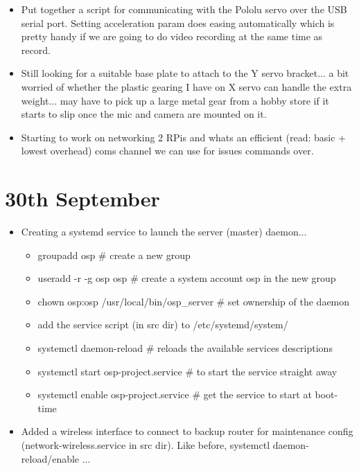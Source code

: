 \begin{itemize}
  \item Put together a script for communicating with the Pololu servo over the USB serial port. Setting acceleration param does easing automatically which is pretty handy if we are going to do video recording at the same time as record.
  \item Still looking for a suitable base plate to attach to the Y servo bracket... a bit worried of whether the plastic gearing I have on X servo can handle the extra weight... may have to pick up a large metal gear from a hobby store if it starts to slip once the mic and camera are mounted on it.
  \item Starting to work on networking 2 RPis and whats an efficient (read: basic + lowest overhead) coms channel we can use for issues commands over.
\end{itemize}



\section*{30th September}

\begin{itemize}
  \item Creating a systemd service to launch the server (master) daemon...
    \begin{itemize}
      \item groupadd osp \# create a new group
      \item useradd -r -g osp osp \# create a system account osp in the new group
      \item chown osp:osp /usr/local/bin/osp\_server \# set ownership of the daemon
      \item add the service script (in src dir) to /etc/systemd/system/
      \item systemctl daemon-reload \# reloads the available services descriptions
      \item systemctl start osp-project.service \# to start the service straight away
      \item systemctl enable osp-project.service \# get the service to start at boot-time
    \end{itemize}
  \item Added a wireless interface to connect to backup router for maintenance config (network-wireless.service in src dir). Like before, systemctl daemon-reload/enable ...

\end{itemize}

